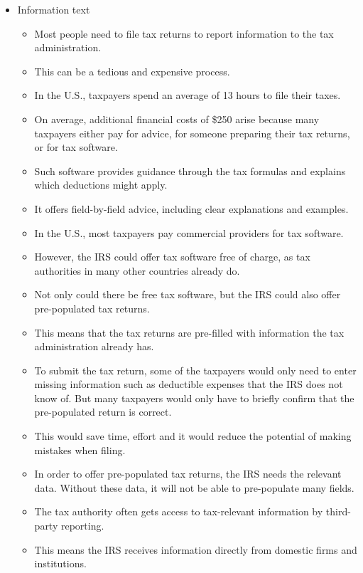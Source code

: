 \documentclass[11pt]{article}
\begin{document}
\begin{itemize}
\begin{itemize}
        \item Information text
        \begin{itemize}
            \item Most people need to file tax returns to report information to the tax administration. 
            \item This can be a tedious and expensive process.
            \item In the U.S., taxpayers spend an average of 13 hours to file their taxes.
            \item On average, additional financial costs of \$250 arise because many taxpayers either pay for advice, for someone preparing their tax returns, or for tax software. 
            \item Such software provides guidance through the tax formulas and explains which deductions might apply.
            \item It offers field-by-field advice, including clear explanations and examples. 
            \item In the U.S., most taxpayers pay commercial providers for tax software.
            \item However, the IRS could offer tax software free of charge, as tax authorities in many other countries already do.
            \item Not only could there be free tax software, but the IRS could also offer pre-populated tax returns. 
            \item This means that the tax returns are pre-filled with information the tax administration already has.
            \item To submit the tax return, some of the taxpayers would only need to enter missing information such as deductible expenses that the IRS does not know of. But many taxpayers would only have to briefly confirm that the pre-populated return is correct.
            \item This would save time, effort and it would reduce the potential of making mistakes when filing. 
            \item In order to offer pre-populated tax returns, the IRS needs the relevant data. Without these data, it will not be able to pre-populate many fields. 
            \item The tax authority often gets access to tax-relevant information by third-party reporting. 
            \item This means the IRS receives information directly from domestic firms and institutions. 

\end{itemize}
\end{itemize}
\end{itemize}
\end{document}
